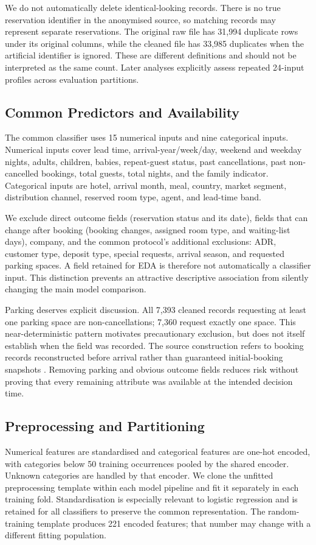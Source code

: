 We do not automatically delete identical-looking records. There is no true reservation identifier in the anonymised source, so matching records may represent separate reservations. The original raw file has 31,994 duplicate rows under its original columns, while the cleaned file has 33,985 duplicates when the artificial identifier is ignored. These are different definitions and should not be interpreted as the same count. Later analyses explicitly assess repeated 24-input profiles across evaluation partitions.

\subsection{Common Predictors and Availability}
The common classifier uses 15 numerical inputs and nine categorical inputs. Numerical inputs cover lead time, arrival-year/week/day, weekend and weekday nights, adults, children, babies, repeat-guest status, past cancellations, past non-cancelled bookings, total guests, total nights, and the family indicator. Categorical inputs are hotel, arrival month, meal, country, market segment, distribution channel, reserved room type, agent, and lead-time band.

We exclude direct outcome fields (reservation status and its date), fields that can change after booking (booking changes, assigned room type, and waiting-list days), company, and the common protocol's additional exclusions: ADR, customer type, deposit type, special requests, arrival season, and requested parking spaces. A field retained for EDA is therefore not automatically a classifier input. This distinction prevents an attractive descriptive association from silently changing the main model comparison.

Parking deserves explicit discussion. All 7,393 cleaned records requesting at least one parking space are non-cancellations; 7,360 request exactly one space. This near-deterministic pattern motivates precautionary exclusion, but does not itself establish when the field was recorded. The source construction refers to booking records reconstructed before arrival rather than guaranteed initial-booking snapshots \citep{antonio2019}. Removing parking and obvious outcome fields reduces risk without proving that every remaining attribute was available at the intended decision time.

\subsection{Preprocessing and Partitioning}
Numerical features are standardised and categorical features are one-hot encoded, with categories below 50 training occurrences pooled by the shared encoder. Unknown categories are handled by that encoder. We clone the unfitted preprocessing template within each model pipeline and fit it separately in each training fold. Standardisation is especially relevant to logistic regression and is retained for all classifiers to preserve the common representation. The random-training template produces 221 encoded features; that number may change with a different fitting population.

